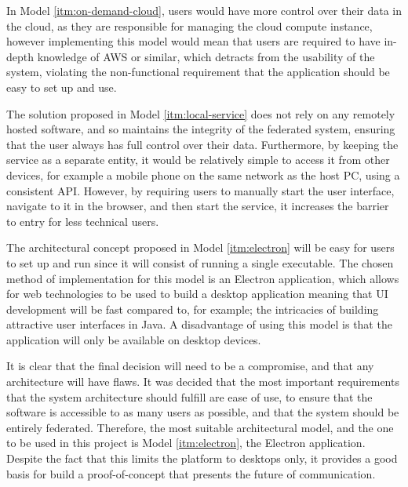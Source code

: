 In Model \ref{itm:on-demand-cloud}, users would have more control over their data in the cloud, as they are responsible for managing the cloud compute instance, however implementing this model would mean that users are required to have in-depth knowledge of AWS or similar, which detracts from the usability of the system, violating the non-functional requirement that the application should be easy to set up and use.

The solution proposed in Model \ref{itm:local-service} does not rely on any remotely hosted software, and so maintains the integrity of the federated system, ensuring that the user always has full control over their data. Furthermore, by keeping the service as a separate entity, it would be relatively simple to access it from other devices, for example a mobile phone on the same network as the host PC, using a consistent API. However, by requiring users to manually start the user interface, navigate to it in the browser, and then start the service, it increases the barrier to entry for less technical users.

The architectural concept proposed in Model \ref{itm:electron} will be easy for users to set up and run since it will consist of running a single executable. The chosen method of implementation for this model is an Electron application, which allows for web technologies to be used to build a desktop application meaning that UI development will be fast compared to, for example; the intricacies of building attractive user interfaces in Java. A disadvantage of using this model is that the application will only be available on desktop devices.

It is clear that the final decision will need to be a compromise, and that any architecture will have flaws. It was decided that the most important requirements that the system architecture should fulfill are ease of use, to ensure that the software is accessible to as many users as possible, and that the system should be entirely federated. Therefore, the most suitable architectural model, and the one to be used in this project is Model \ref{itm:electron}, the Electron application. Despite the fact that this limits the platform to desktops only, it provides a good basis for build a proof-of-concept that presents the future of communication.

